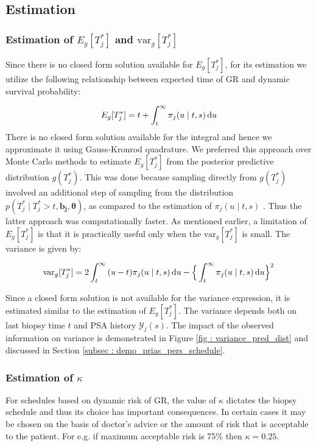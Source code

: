 
\subsection{Estimation}
\subsubsection{Estimation of $E_g[T^*_j]$ and $\mbox{var}_g[T^*_j]$}
Since there is no closed form solution available for $E_g[T^*_j]$, for its estimation we utilize the following relationship between expected time of GR and dynamic survival probability:

\begin{equation}
\label{eq : expected_time_survprob}
E_g[T^*_j] = t + \int_t^\infty \pi_j(u \mid t, s) \mathop{}\!\mathrm{d} u
\end{equation}
There is no closed form solution available for the integral and hence we approximate it using Gauss-Kronrod quadrature. We preferred this approach over Monte Carlo methods to estimate $E_g[T^*_j]$ from the posterior predictive distribution $g(T^*_j)$. This was done because sampling directly from $g(T^*_j)$ involved an additional step of sampling from the distribution $p(T^*_j \mid T^*_j > t, \boldsymbol{b_j}, \boldsymbol{\theta})$, as compared to the estimation of $\pi_j(u \mid t, s)$ \citep{rizopoulos2011dynamic}. Thus the latter approach was computationally faster. As mentioned earlier, a limitation of $E_g[T^*_j]$ is that it is practically useful only when the $\mbox{var}_g[T^*_j]$ is small. The variance is given by:

\begin{equation}
\label{eq : var_time_survprob}
\mbox{var}_g[T^*_j] = 2 \int_t^\infty {(u-t) \pi_j(u \mid t, s) \mathop{}\!\mathrm{d}u} - \Big\{\int_t^\infty \pi_j(u \mid t, s) \mathop{}\!\mathrm{d} u\Big\}^2
\end{equation}

Since a closed form solution is not available for the variance expression, it is estimated similar to the estimation of $E_g[T^*_j]$. The variance depends both on last biopsy time $t$ and PSA history $\mathcal{Y}_j(s)$. The impact of the observed information on variance is demonstrated in Figure \ref{fig : variance_pred_dist} and discussed in Section \ref{subsec : demo_prias_pers_schedule}.

\subsubsection{Estimation of $\kappa$}
\label{subsubsec : kappa_estimation}
For schedules based on dynamic risk of GR, the value of $\kappa$ dictates the biopsy schedule and thus its choice has important consequences. In certain cases it may be chosen on the basis of doctor's advice or the amount of risk that is acceptable to the patient. For e.g. if maximum acceptable risk is 75\% then $\kappa = 0.25$.\\

